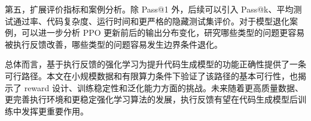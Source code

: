 第五，扩展评价指标和案例分析。除 Pass@1 外，后续可以引入 Pass@k、平均测试通过率、代码复杂度、运行时间和更严格的隐藏测试集评价。对于模型退化案例，可以进一步分析 PPO 更新前后的输出分布变化，研究哪些类型的问题更容易被执行反馈改善，哪些类型的问题容易发生边界条件退化。

总体而言，基于执行反馈的强化学习为提升代码生成模型的功能正确性提供了一条可行路径。本文在小规模数据和有限算力条件下验证了该路径的基本可行性，也揭示了 reward 设计、训练稳定性和泛化能力方面的挑战。未来随着更高质量数据、更完善执行环境和更稳定强化学习算法的发展，执行反馈有望在代码生成模型后训练中发挥更重要作用。

